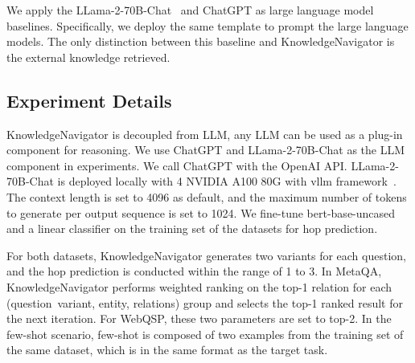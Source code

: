 \documentclass{article}
\begin{document}
We apply the LLama-2-70B-Chat~\cite{llama2} and ChatGPT as large language model baselines. Specifically, we deploy the same template to prompt the large language models. The only distinction between this baseline and KnowledgeNavigator is the external knowledge retrieved.

\subsection{Experiment Details}


KnowledgeNavigator is decoupled from LLM, any LLM can be used as a plug-in component for reasoning. We use ChatGPT and LLama-2-70B-Chat as the LLM component in experiments. We call ChatGPT with the OpenAI API. LLama-2-70B-Chat is deployed locally with 4 NVIDIA A100 80G with vllm framework~\cite{vllm}. The context length is set to 4096 as default, and the maximum number of tokens to generate per output sequence is set to 1024.  We fine-tune bert-base-uncased and a linear classifier on the training set of the datasets for hop prediction.

For both datasets, KnowledgeNavigator generates two variants for each question, and the hop prediction is conducted within the range of 1 to 3. In MetaQA, KnowledgeNavigator performs weighted ranking on the top-1 relation for each (question~variant, entity, relations) group and selects the top-1 ranked result for the next iteration. For WebQSP, these two parameters are set to top-2. In the few-shot scenario, few-shot is composed of two examples from the training set of the same dataset, which is in the same format as the target task.
\end{document}
